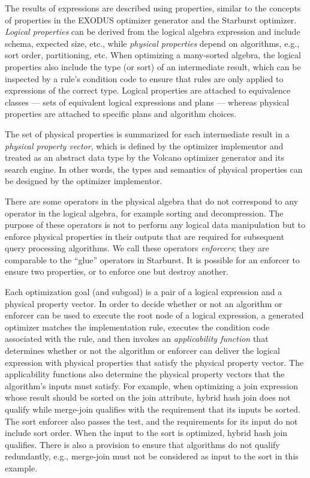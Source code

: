 \documentclass[a4paper,12pt,notitlepage,twoside,openright]{article}
\begin{document}
The results of expressions are described using properties, similar to
the concepts of properties in the EXODUS optimizer generator and the
Starburst optimizer. \emph{Logical properties} can be derived from the logical
algebra expression and include schema, expected size, etc., while
\emph{physical properties} depend on algorithms, e.g., sort order,
partitioning, etc. When optimizing a many-sorted algebra, the logical
properties also include the type (or sort) of an intermediate result,
which can be inspected by a rule's condition code to ensure that rules
are only applied to expressions of the correct type. Logical properties
are attached to equivalence classes --- sets of equivalent logical
expressions and plans --- whereas physical properties are attached to
specific plans and algorithm choices.

The set of physical properties is summarized for each intermediate
result in a \emph{physical property vector}, which is defined by the
optimizer implementor and treated as an abstract data type by the
Volcano optimizer generator and its search engine. In other words, the
types and semantics of physical properties can be designed by the
optimizer implementor.

There are some operators in the physical algebra that do not correspond
to any operator in the logical algebra, for example sorting and
decompression. The purpose of these operators is not to perform any
logical data manipulation but to enforce physical properties in their
outputs that are required for subsequent query processing algorithms. We
call these operators \emph{enforcers}; they are comparable to the ``glue''
operators in Starburst. It is possible for an enforcer to ensure two
properties, or to enforce one but destroy another.

Each optimization goal (and subgoal) is a pair of a logical expression
and a physical property vector. In order to decide whether or not an
algorithm or enforcer can be used to execute the root node of a logical
expression, a generated optimizer matches the implementation rule,
executes the condition code associated with the rule, and then invokes
an \emph{applicability function} that determines whether or not the algorithm
or enforcer can deliver the logical expression with physical properties
that satisfy the physical property vector. The applicability functions
also determine the physical property vectors that the algorithm's inputs
must satisfy. For example, when optimizing a join expression whose
result should be sorted on the join attribute, hybrid hash join does not
qualify while merge-join qualifies with the requirement that its inputs
be sorted. The sort enforcer also passes the test, and the requirements
for its input do not include sort order. When the input to the sort is
optimized, hybrid hash join qualifies. There is also a provision to
ensure that algorithms do not qualify redundantly, e.g., merge-join must
not be considered as input to the sort in this example.
\end{document}
